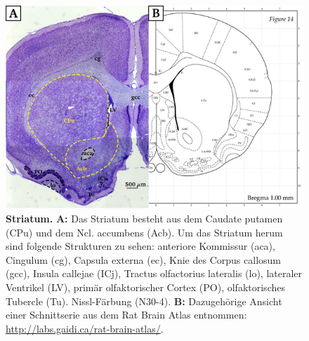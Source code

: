\documentclass[12pt,a4paper,pdftex]{article}
\begin{document}
\begin{figure}[H]
    \centering
    \includegraphics{pictures/Basalganglia/Nucleus_acumbens.png}
    \caption[Striatum]{\textbf{Striatum.} \textbf{A:} Das Striatum besteht aus dem Caudate putamen (CPu) und dem Ncl. accumbens (Acb). Um das Striatum herum sind folgende Strukturen zu sehen: anteriore Kommissur (aca), Cingulum (cg), Capsula externa (ec), Knie des Corpus callosum (gcc), Insula callejae (ICj), Tractus olfactorius lateralis (lo), lateraler Ventrikel (LV), primär olfaktorischer Cortex (PO), olfaktorisches Tubercle (Tu). Nissl-Färbung (N30-4). \textbf{B:} Dazugehörige Ansicht einer Schnittserie aus dem Rat Brain Atlas entnommen: \url{http://labs.gaidi.ca/rat-brain-atlas/}.}
    \label{fig:Nucleus_accumbens}
\end{figure}

\newpage
\end{document}
